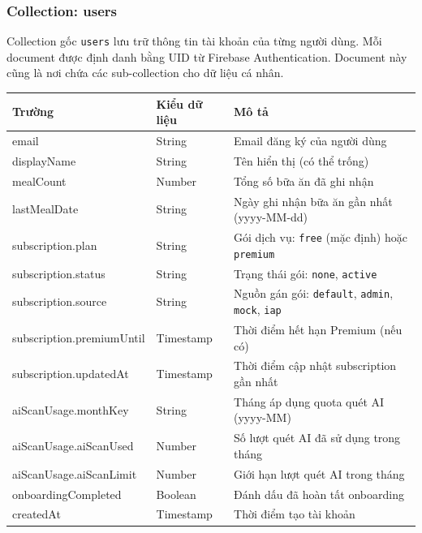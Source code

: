 \subsubsection{Collection: users}

Collection gốc \texttt{users} lưu trữ thông tin tài khoản của từng người dùng. Mỗi document được định danh bằng UID từ Firebase Authentication. Document này cũng là nơi chứa các sub-collection cho dữ liệu cá nhân.

\begin{longtable}{|p{3.5cm}|p{3.5cm}|p{7.5cm}|}
    \hline
    \textbf{Trường} & \textbf{Kiểu dữ liệu} & \textbf{Mô tả} \\
    \hline
    \endhead
    \hline
    \endfoot
    email & String & Email đăng ký của người dùng \\
    \hline
    displayName & String & Tên hiển thị (có thể trống) \\
    \hline
    mealCount & Number & Tổng số bữa ăn đã ghi nhận \\
    \hline
    lastMealDate & String & Ngày ghi nhận bữa ăn gần nhất (yyyy-MM-dd) \\
    \hline
    subscription.plan & String & Gói dịch vụ: \texttt{free} (mặc định) hoặc \texttt{premium} \\
    \hline
    subscription.status & String & Trạng thái gói: \texttt{none}, \texttt{active} \\
    \hline
    subscription.source & String & Nguồn gán gói: \texttt{default}, \texttt{admin}, \texttt{mock}, \texttt{iap} \\
    \hline
    subscription.premiumUntil & Timestamp & Thời điểm hết hạn Premium (nếu có) \\
    \hline
    subscription.updatedAt & Timestamp & Thời điểm cập nhật subscription gần nhất \\
    \hline
    aiScanUsage.monthKey & String & Tháng áp dụng quota quét AI (yyyy-MM) \\
    \hline
    aiScanUsage.aiScanUsed & Number & Số lượt quét AI đã sử dụng trong tháng \\
    \hline
    aiScanUsage.aiScanLimit & Number & Giới hạn lượt quét AI trong tháng \\
    \hline
    onboardingCompleted & Boolean & Đánh dấu đã hoàn tất onboarding \\
    \hline
    createdAt & Timestamp & Thời điểm tạo tài khoản \\
    \hline
\end{longtable}

